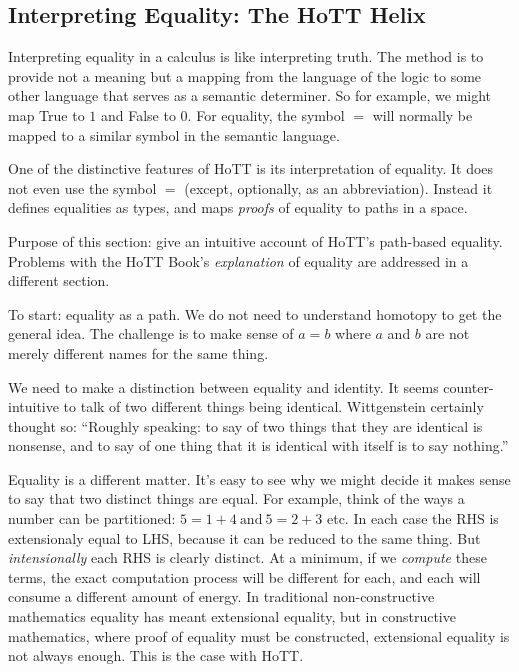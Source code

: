 \documentclass{article}
\begin{document}
\subsection{Interpreting Equality: The HoTT Helix}

Interpreting equality in a calculus is like interpreting truth. The
method is to provide not a meaning but a mapping from the language of
the logic to some other language that serves as a semantic determiner.
So for example, we might map \textsf{True} to \(1\) and \textsf{False}
to 0. For equality, the symbol \(=\) will normally be mapped to a
similar symbol in the semantic language.

One of the distinctive features of HoTT is its interpretation of
equality. It does not even use the symbol \(=\) (except, optionally,
as an abbreviation). Instead it defines equalities as types, and maps
\textit{proofs} of equality to paths in a space.

Purpose of this section: give an intuitive account of HoTT's
path-based equality. Problems with the HoTT Book's
\textit{explanation} of equality are addressed in a different section.

To start: equality as a path. We do not need to understand homotopy to
get the general idea. The challenge is to make sense of \(a=b\) where
\(a\) and \(b\) are not merely different names for the same thing.

We need to make a distinction between equality and identity. It seems
counter-intuitive to talk of two different things being identical.
Wittgenstein certainly thought so: \enquote{Roughly speaking: to say
  of two things that they are identical is nonsense, and to say of one
  thing that it is identical with itself is to say nothing.}

Equality is a different matter. It's easy to see why we might decide
it makes sense to say that two distinct things are equal. For example,
think of the ways a number can be partitioned:
\(5=1+4\ \text{and}\ 5=2+3\) etc. In each case the RHS
is extensionaly equal to LHS, because it can be reduced to the same
thing. But \textit{intensionally} each RHS is clearly distinct. At a
minimum, if we \textit{compute} these terms, the exact computation
process will be different for each, and each will consume a different
amount of energy. In traditional non-constructive mathematics equality
has meant extensional equality, but in constructive mathematics, where
proof of equality must be constructed, extensional equality is not
always enough. This is the case with HoTT.
\end{document}
